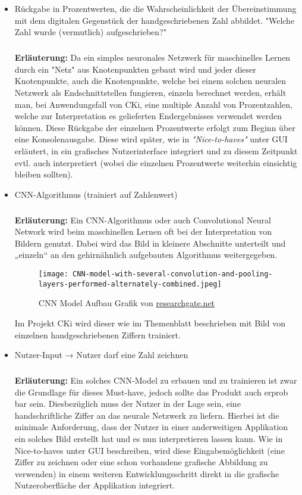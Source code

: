 \begin{itemize}
\item 
Rückgabe in Prozentwerten, die die Wahrscheinlichkeit der Übereinstimmung mit dem digitalen Gegenstück der handgeschriebenen Zahl abbildet. "Welche Zahl wurde (vermutlich) aufgeschrieben?"
\subparagraph{}
\textbf{Erläuterung:}
Da ein simples neuronales Netzwerk für maschinelles Lernen durch ein "Netz" aus Knotenpunkten gebaut wird und jeder dieser Knotenpunkte, auch die Knotenpunkte, welche bei einem solchen neuralen Netzwerk als Endschnittstellen fungieren, einzeln berechnet werden, erhält man, bei Anwendungsfall von CKi, eine multiple Anzahl von Prozentzahlen, welche zur Interpretation es gelieferten Endergebnisses verwendet werden können. Diese Rückgabe der einzelnen Prozentwerte erfolgt zum Beginn über eine Konsolenausgabe. Diese wird später, wie in \textit{"Nice-to-haves"} unter GUI erläutert, in ein grafisches Nutzerinterface integriert und zu diesem Zeitpunkt evtl. auch interpretiert (wobei die einzelnen Prozentwerte weiterhin einsichtig bleiben sollten).

\item CNN-Algorithmus (trainiert auf Zahlenwert)
\subparagraph{}
\textbf{Erläuterung:}
Ein CNN-Algorithmus oder auch Convolutional Neural Network wird beim maschinellen Lernen oft bei der Interpretation von Bildern genutzt. Dabei wird das Bild in kleinere Abschnitte unterteilt und „einzeln“ an den gehirnähnlich aufgebauten Algorithmus weitergegeben.
\begin{figure}[H]
\centering
\texttt{[image: CNN-model-with-several-convolution-and-pooling-layers-performed-alternately-combined.jpeg]}
\caption{CNN Model Aufbau Grafik von \href{https://www.researchgate.net/publication/309751512_Content-Aware_Convolutional_Neural_Network_for_Object_Recognition_Task}{researchgate.net}}
\label{fig:AnalyseCNN-model-with-several-convolution-and-pooling-layers-performed-alternately-combined}
\end{figure}
Im Projekt CKi wird dieser wie im Themenblatt beschrieben mit Bild von einzelnen handgeschriebenen Ziffern trainiert.

\item Nutzer-Input → Nutzer darf eine Zahl zeichnen
\subparagraph{}
\textbf{Erläuterung:}
Ein solches CNN-Model zu erbauen und zu trainieren ist zwar die Grundlage für dieses Must-have, jedoch sollte das Produkt auch erprob bar sein. Diesbezüglich muss der Nutzer in der Lage sein, eine handschriftliche Ziffer an das neurale Netzwerk zu liefern. Hierbei ist die minimale Anforderung, dass der Nutzer in einer anderweitigen Applikation ein solches Bild erstellt hat und es nun interpretieren lassen kann. Wie in Nice-to-haves unter GUI beschreiben, wird diese Eingabemöglichkeit (eine Ziffer zu zeichnen oder eine schon vorhandene grafische Abbildung zu verwenden) in einem weiteren Entwicklungsschritt direkt in die grafische Nutzeroberfläche der Applikation integriert.

\end{itemize}

